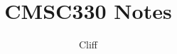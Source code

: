 \documentclass[10pt]{book} %
\title{CMSC330 Notes}
\author{Cliff }
\date{}
\begin{document}
\maketitle
\begingroup
\let\cleardoublepage\clearpage
\tableofcontents
\endgroup



% 



% 

%
%

%
% 
% 
% 
\end{document}
